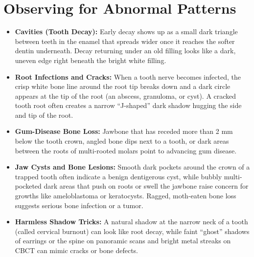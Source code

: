 \section{Observing for Abnormal Patterns}
\begin{itemize}
\item \textbf{Cavities (Tooth Decay):} Early decay shows up as a small dark triangle between teeth in the enamel that spreads wider once it reaches the softer dentin underneath. Decay returning under an old filling looks like a dark, uneven edge right beneath the bright white filling.
\item \textbf{Root Infections and Cracks:} When a tooth nerve becomes infected, the crisp white bone line around the root tip breaks down and a dark circle appears at the tip of the root (an abscess, granuloma, or cyst). A cracked tooth root often creates a narrow ``J-shaped'' dark shadow hugging the side and tip of the root.
\item \textbf{Gum-Disease Bone Loss:} Jawbone that has receded more than 2 mm below the tooth crown, angled bone dips next to a tooth, or dark areas between the roots of multi-rooted molars point to advancing gum disease.
\item \textbf{Jaw Cysts and Bone Lesions:} Smooth dark pockets around the crown of a trapped tooth often indicate a benign dentigerous cyst, while bubbly multi-pocketed dark areas that push on roots or swell the jawbone raise concern for growths like ameloblastoma or keratocysts. Ragged, moth-eaten bone loss suggests serious bone infection or a tumor.
\item \textbf{Harmless Shadow Tricks:} A natural shadow at the narrow neck of a tooth (called cervical burnout) can look like root decay, while faint ``ghost'' shadows of earrings or the spine on panoramic scans and bright metal streaks on CBCT can mimic cracks or bone defects.
\end{itemize}

